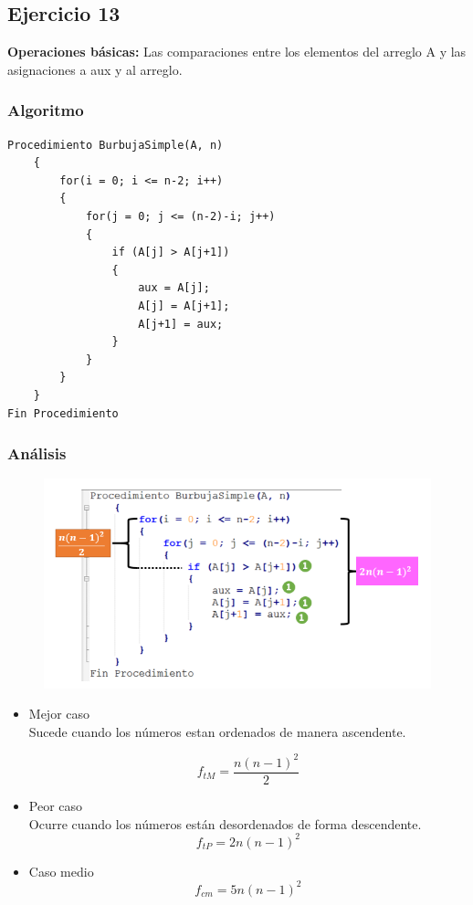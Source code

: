 \documentclass[12pt]{article}
\begin{document}
	    \subsection{Ejercicio 13}
		\textbf{Operaciones básicas:} Las comparaciones entre los elementos del arreglo A y las asignaciones a aux y al arreglo.

			\subsubsection{Algoritmo}
			    \begin{lstlisting}[style=Java]
Procedimiento BurbujaSimple(A, n)
	{
		for(i = 0; i <= n-2; i++)
		{
			for(j = 0; j <= (n-2)-i; j++)
			{
				if (A[j] > A[j+1])
				{
					aux = A[j];
					A[j] = A[j+1];
					A[j+1] = aux;
				}
			}
		}
	}
Fin Procedimiento
    		    \end{lstlisting}

	        \subsubsection{Análisis}

		        \begin{figure}[h!]
	                \centering
	                \includegraphics[width=\textwidth]{Abigail/Images/EJER13.PNG}
	 		    \end{figure} 

	    		\begin{itemize}
	    			\item[\Checklist] Mejor caso \\
	    			Sucede cuando los números estan ordenados de manera ascendente.

	    			$$
	    				f_{tM} = \frac{n(n-1)^{2}}{2}
	    			$$

	    			\item[\Checklist] Peor caso \\
					Ocurre cuando los números están desordenados de forma descendente.
					$$
						f_{tP} = 2n(n-1)^{2}
					$$
					\item[\Checklist] Caso medio \\
					$$
						f_{cm} = 5n(n-1)^{2}
					$$

				\end{itemize}	        
\end{document}

